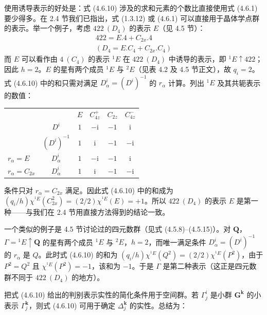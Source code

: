 使用诱导表示的好处是：式 (4.6.10) 涉及的求和元素的个数比直接使用式 (4.6.1) 要少得多。在 2.4 节我们已指出，式 (1.3.12) 或 (4.6.1) 可以直接用于晶体学点群的表示。举一个例子，考虑 $422\ (D_{4})$ 的表示 $E$（见 4.5 节）：
\begin{equation*}
\begin{array}{l}
422 = E.4 + C_{2x}.4\\
\left(D_{4} = E.C_{4} + C_{2x}.C_{4}\right)
\end{array}
\tag{4.5.1}
\end{equation*}
而 $E$ 可以看作由 $4\ (C_{4})$ 的表示 ${}^{1}E$ 在 $422\ (D_{4})$ 中诱导的表示，即 ${}^{1}E \uparrow 422$；因此 $h = 2$。$E$ 的星有两个成员 ${}^{1}E$ 与 ${}^{2}E$（见表 4.2 及 4.5 节正文），故 $q_{i} = 2$。式 (4.6.10) 中的和只需对满足 $D^{i}_{\alpha} = (D^{i})^{-1}$ 的 $r_{\alpha}$ 计算。列出 ${}^{1}E$ 及其共轭表示的数值：
\begin{center}
\begin{tabular}{lccccc}
 & & $E$ & $C^{+}_{4z}$ & $C_{2z}$ & $C^{-}_{4z}$\\
 & $D^{i}$ & $1$ & $-\mathrm{i}$ & $-1$ & $\mathrm{i}$\\
 & $(D^{i})^{-1}$ & $1$ & $\mathrm{i}$ & $-1$ & $-\mathrm{i}$\\
$r_{\alpha} = E$ & $D^{i}_{\alpha}$ & $1$ & $-\mathrm{i}$ & $-1$ & $\mathrm{i}$\\
$r_{\alpha} = C_{2x}$ & $D^{i}_{\alpha}$ & $1$ & $\mathrm{i}$ & $-1$ & $-\mathrm{i}$
\end{tabular}
\end{center}
条件只对 $r_{\alpha} = C_{2x}$ 满足。因此式 (4.6.10) 中的和成为 $(q_{i}/h)\chi^{{}^{1}E}(C^{2}_{2x}) = (2/2)\chi^{{}^{1}E}(E) = +1$。所以 $422\ (D_{4})$ 的表示 $E$ 是第一种——与我们在 2.4 节用直接方法得到的结论一致。

一个类似的例子是 4.5 节讨论过的四元数群（见式 (4.5.8)--(4.5.15)）。对 $\mathbf{Q}$，$\Gamma = {}^{1}E \uparrow \mathbf{Q}$ 的星有两个成员 ${}^{1}E$ 与 ${}^{2}E$，$h = 2$，而唯一满足条件 $D^{i}_{\alpha} = (D^{i})^{-1}$ 的 $r_{\alpha}$ 是 $Q$。此时式 (4.6.10) 的和为 $(q_{i}/h)\chi^{{}^{1}E}(Q^{2}) = (2/2)\chi^{{}^{1}E}(P^{2})$，由于 $P^{2} = Q^{2}$ 且 $\chi^{{}^{1}E}(P^{2}) = -1$，该和为 $-1$。于是 $\Gamma$ 是第二种表示（这正是四元数群不同于 $422\ (D_{4})$ 的地方）。

把式 (4.6.10) 给出的判别表示实性的简化条件用于空间群。若 $\Gamma^{i}_{j}$ 是小群 $\mathbf{G}^{\mathbf{k}}$ 的小表示 $\Gamma^{\mathbf{k}}_{j}$，则式 (4.6.10) 可用于确定 $\Delta^{\mathbf{k}}_{j}$ 的实性。总结为：

